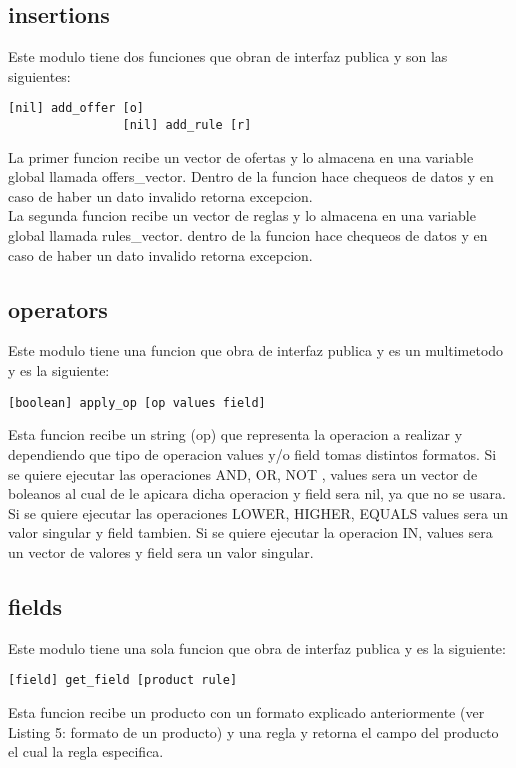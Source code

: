 \documentclass[a4paper, 12pt]{article}
\begin{document}
		\subsection{insertions}
			Este modulo tiene dos funciones que obran de interfaz publica y son las siguientes:
			\begin{lstlisting}[frame=tb, caption=firmas de la interfaz publica, label=zebra, tabsize=1]
				[nil] add_offer [o]
				[nil] add_rule [r]
			\end{lstlisting}
			La primer funcion recibe un vector de ofertas y lo almacena en una variable global llamada offers\_vector. Dentro de la 			funcion hace chequeos de datos y en caso de haber un dato invalido retorna excepcion.\\
			La segunda funcion recibe un vector de reglas y lo almacena en una variable global llamada rules\_vector. dentro de la 				funcion hace chequeos de datos y en caso de haber un dato invalido retorna excepcion.\\
		\newpage
		\subsection{operators}
			Este modulo tiene una funcion que obra de interfaz publica y es un multimetodo y es la siguiente:
			\begin{lstlisting}[frame=tb, caption=firmas de la interfaz publica, label=zebra, tabsize=1]
				[boolean] apply_op [op values field]
			\end{lstlisting}
			Esta funcion recibe un string (op) que representa la operacion a realizar y dependiendo que tipo de operacion values 
			y/o field tomas distintos formatos. Si se quiere ejecutar las operaciones AND, OR, NOT , values sera un vector de 				boleanos al cual de le apicara dicha operacion y field sera nil, ya que no se usara. Si se quiere ejecutar las 				operaciones LOWER, HIGHER, EQUALS values sera un valor singular y field tambien. Si se quiere ejecutar la operacion IN, 			values sera un vector de valores y field sera un valor singular.

		\newpage
		\subsection{fields}
			Este modulo tiene una sola funcion que obra de interfaz publica y es la siguiente:
			\begin{lstlisting}[frame=tb, caption=firmas de la interfaz publica, label=zebra, tabsize=1]
				[field] get_field [product rule]
			\end{lstlisting}
			Esta funcion recibe un producto	con un formato explicado anteriormente (ver Listing 5: formato de un producto) y una 				regla y retorna el campo del producto el cual la regla especifica.\\
\end{document}
